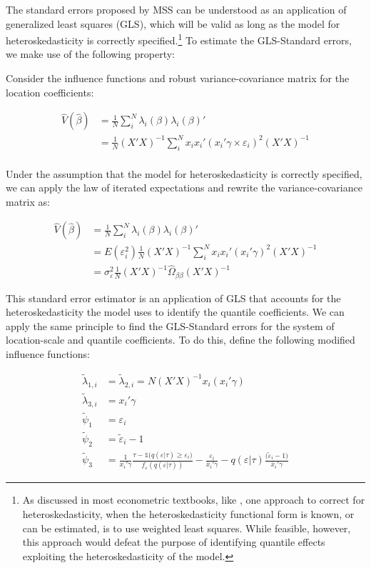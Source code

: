 \documentclass[
  authoryear,
  review,
  1p]{elsarticle}
\begin{document}
The standard errors proposed by MSS can be understood as an application
of generalized least squares (GLS), which will be valid as long as the
model for heteroskedasticity is correctly specified.\footnote{As
  discussed in most econometric textbooks, like \citet{cameron2005}, one
  approach to correct for heteroskedasticity, when the
  heteroskedasticity functional form is known, or can be estimated, is
  to use weighted least squares. While feasible, however, this approach
  would defeat the purpose of identifying quantile effects exploiting
  the heteroskedasticity of the model.} To estimate the GLS-Standard
errors, we make use of the following property:

Consider the influence functions and robust variance-covariance matrix
for the location coefficients:

\[\begin{aligned}
\hat V(\hat \beta) &= \frac{1}{N} \sum_i^N \lambda_{i}(\beta) \lambda_{i}(\beta)' \\
&= \frac{1}{N}  (X'X)^{-1}  \sum_i^N x_i x_i' ( x_i'\gamma \times \varepsilon_i)^2 (X'X)^{-1} \\
\end{aligned}
\]

Under the assumption that the model for heteroskedasticity is correctly
specified, we can apply the law of iterated expectations and rewrite the
variance-covariance matrix as:

\[\begin{aligned}
\hat V(\hat \beta) &= \frac{1}{N} \sum_i^N \lambda_{i}(\beta) \lambda_{i}(\beta)' \\
&= E(\varepsilon_i^2) \frac{1}{N}  (X'X)^{-1}  \sum_i^N x_i x_i' ( x_i'\gamma)^2 (X'X)^{-1} \\
&= \sigma^2_{\varepsilon} \frac{1}{N}  (X'X)^{-1}  \hat\Omega_{\beta\beta} (X'X)^{-1}  
\end{aligned}
\]

This standard error estimator is an application of GLS that accounts for
the heteroskedasticity the model uses to identify the quantile
coefficients. We can apply the same principle to find the GLS-Standard
errors for the system of location-scale and quantile coefficients. To do
this, define the following modified influence functions:

\[\begin{aligned}
\tilde \lambda_{1,i}&=\tilde \lambda_{2,i}=N (X'X)^{-1}  x_i ( x_i'\gamma) \\  
\tilde \lambda_{3,i}&=x_i' \gamma  \\
\tilde \psi_1 &= \varepsilon_i \\
\tilde \psi_2 &= \tilde \varepsilon_i -1 \\
\tilde \psi_3 &= \frac{1}{ x_i' \gamma }\frac{\tau-\mathbb{1}\big( q(\varepsilon|\tau)  \geq \varepsilon_i  \big) }{ f_{\varepsilon}(q(\varepsilon|\tau))} - \frac{\varepsilon_i }{\bar x_i'\gamma} 
-  q(\varepsilon|\tau) \frac{(\tilde \varepsilon_i -1\big)}{\bar x_i'\gamma}
\end{aligned}
\]
\end{document}
